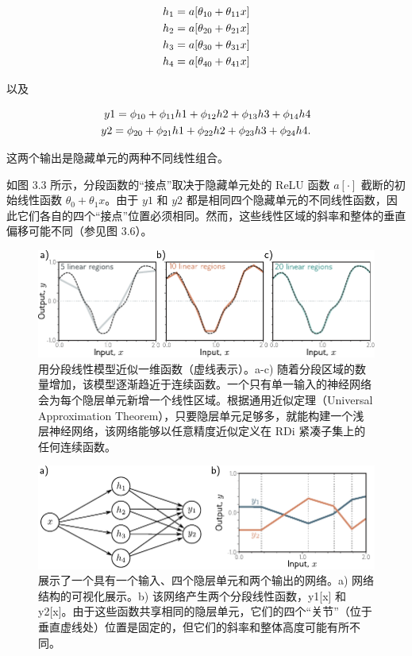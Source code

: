 \documentclass[lang=cn,newtx,10pt,scheme=chinese]{elegantbook}
\begin{document}
\begin{align}
	h_1 = a[\theta_{10} + \theta_{11}x] \notag \\
	h_2 = a[\theta_{20} + \theta_{21}x] \notag \\
	h_3 = a[\theta_{30} + \theta_{31}x] \notag \\
	h_4 = a[\theta_{40} + \theta_{41}x]  
\end{align} 

以及

\begin{align}
	y1 = \phi_{10} + \phi_{11}h1 + \phi_{12}h2 + \phi_{13}h3 + \phi_{14}h4 \notag \\
	y2 = \phi_{20} + \phi_{21}h1 + \phi_{22}h2 + \phi_{23}h3 + \phi_{24}h4. 
\end{align} 


这两个输出是隐藏单元的两种不同线性组合。

如图 3.3 所示，分段函数的“接点”取决于隐藏单元处的 ReLU 函数 \(a[\cdot]\) 截断的初始线性函数 \(\theta_0 + \theta_1x\)。由于 \(y1\) 和 \(y2\) 都是相同四个隐藏单元的不同线性函数，因此它们各自的四个“接点”位置必须相同。然而，这些线性区域的斜率和整体的垂直偏移可能不同（参见图 3.6）。

\begin{figure}[ht!]
	\centering
	\includegraphics[width=0.7\linewidth]{PDFFigures/UDLChap3PDF/ShallowApproximate.pdf}
\caption{用分段线性模型近似一维函数（虚线表示）。a-c) 随着分段区域的数量增加，该模型逐渐趋近于连续函数。一个只有单一输入的神经网络会为每个隐层单元新增一个线性区域。根据通用近似定理（Universal Approximation Theorem），只要隐层单元足够多，就能构建一个浅层神经网络，该网络能够以任意精度近似定义在 RDi 紧凑子集上的任何连续函数。}
\end{figure}

\begin{figure}[ht!]
	\centering
	\includegraphics[width=0.7\linewidth]{PDFFigures/UDLChap3PDF/ShallowNetTwoOutputs.pdf}
\caption{展示了一个具有一个输入、四个隐层单元和两个输出的网络。a) 网络结构的可视化展示。b) 该网络产生两个分段线性函数，y1[x] 和 y2[x]。由于这些函数共享相同的隐层单元，它们的四个“关节”（位于垂直虚线处）位置是固定的，但它们的斜率和整体高度可能有所不同。}
\end{figure}
\end{document}
